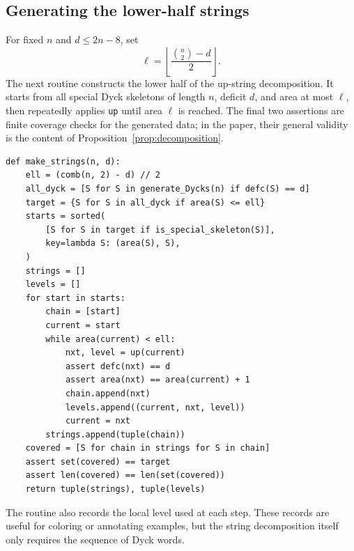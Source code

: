 \documentclass[11pt]{article}
\theoremstyle{plain}
\theoremstyle{definition}
\theoremstyle{remark}
\begin{document}
\subsection{Generating the lower-half strings}
\label{subsec:string-code}
For fixed \(n\) and \(d\le 2n-8\), set
\[
  \ell=\left\lfloor\frac{\binom n2-d}{2}\right\rfloor .
\]
The next routine constructs the lower half of the \(\mathrm{up}\)-string
decomposition.  It starts from all special Dyck skeletons of length \(n\), deficit
\(d\), and area at most \(\ell\), then repeatedly applies \lstinline{up} until
area \(\ell\) is reached.  The final two assertions are finite coverage checks
for the generated data; in the paper, their general validity is the content of
Proposition~\ref{prop:decomposition}.
\begin{lstlisting}
def make_strings(n, d):
    ell = (comb(n, 2) - d) // 2
    all_dyck = [S for S in generate_Dycks(n) if defc(S) == d]
    target = {S for S in all_dyck if area(S) <= ell}
    starts = sorted(
        [S for S in target if is_special_skeleton(S)],
        key=lambda S: (area(S), S),
    )
    strings = []
    levels = []
    for start in starts:
        chain = [start]
        current = start
        while area(current) < ell:
            nxt, level = up(current)
            assert defc(nxt) == d
            assert area(nxt) == area(current) + 1
            chain.append(nxt)
            levels.append((current, nxt, level))
            current = nxt
        strings.append(tuple(chain))
    covered = [S for chain in strings for S in chain]
    assert set(covered) == target
    assert len(covered) == len(set(covered))
    return tuple(strings), tuple(levels)
\end{lstlisting}
The routine also records the local level used at each step.  These
records are useful for coloring or annotating examples, but the string
decomposition itself only requires the sequence of Dyck words.
\end{document}
